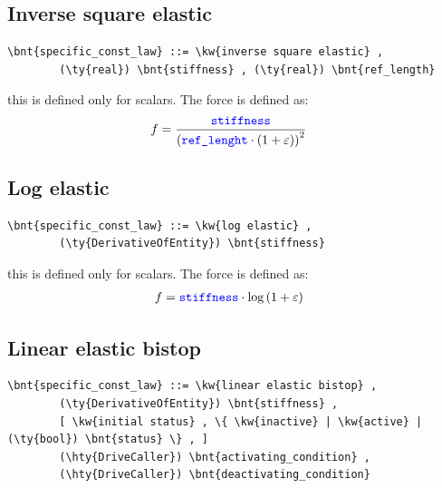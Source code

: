 \subsection{Inverse square elastic}
\begin{Verbatim}[commandchars=\\\{\}]
    \bnt{specific_const_law} ::= \kw{inverse square elastic} ,
        (\ty{real}) \bnt{stiffness} , (\ty{real}) \bnt{ref_length}
\end{Verbatim}
this is defined only for scalars. The force is defined as:
\begin{align}
    f &= \frac{\textcolor{blue}{\texttt{stiffness}}}{\left( \textcolor{blue}{\texttt{ref\_lenght}} \cdot \left( 1 + \varepsilon \right) \right)^2}
\end{align}
  
\subsection{Log elastic}
\begin{Verbatim}[commandchars=\\\{\}]
    \bnt{specific_const_law} ::= \kw{log elastic} ,
        (\ty{DerivativeOfEntity}) \bnt{stiffness}
\end{Verbatim}
this is defined only for scalars. The force is defined as:
\begin{align}
    f &= \textcolor{blue}{\texttt{stiffness}} \cdot \mathrm{log}\left( 1 + \varepsilon \right)
\end{align}
  
\subsection{Linear elastic bistop}
\begin{Verbatim}[commandchars=\\\{\}]
    \bnt{specific_const_law} ::= \kw{linear elastic bistop} ,
        (\ty{DerivativeOfEntity}) \bnt{stiffness} ,
        [ \kw{initial status} , \{ \kw{inactive} | \kw{active} | (\ty{bool}) \bnt{status} \} , ]
        (\hty{DriveCaller}) \bnt{activating_condition} ,
        (\hty{DriveCaller}) \bnt{deactivating_condition}
\end{Verbatim}
  
